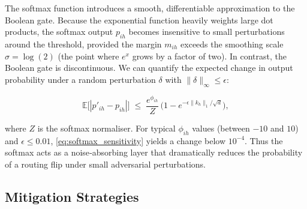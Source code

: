 The softmax function introduces a smooth, differentiable approximation to the Boolean gate.  Because the exponential function heavily weights large dot products, the softmax output $p_{ih}$ becomes insensitive to small perturbations around the threshold, provided the margin $m_{ih}$ exceeds the smoothing scale $\sigma=\log(2)$ (the point where $e^{x}$ grows by a factor of two).  In contrast, the Boolean gate is discontinuous.  We can quantify the expected change in output probability under a random perturbation $\delta$ with $\|\delta\|_\infty\le\epsilon$:













\begin{equation}






\label{eq:softmax_sensitivity}






\mathbb{E}\bigl[|p'_{ih}-p_{ih}|\bigr]






 \;\le\; \frac{e^{\phi_{ih}}}{Z}\,\bigl(1-e^{-\epsilon\|k_h\|_1/\sqrt{d}}\bigr),






\end{equation}






where $Z$ is the softmax normaliser.  For typical $\phi_{ih}$ values (between $-10$ and $10$) and $\epsilon\le 0.01$, \eqref{eq:softmax_sensitivity} yields a change below $10^{-4}$.  Thus the softmax acts as a noise‑absorbing layer that dramatically reduces the probability of a routing flip under small adversarial perturbations.













\subsection{Mitigation Strategies}













